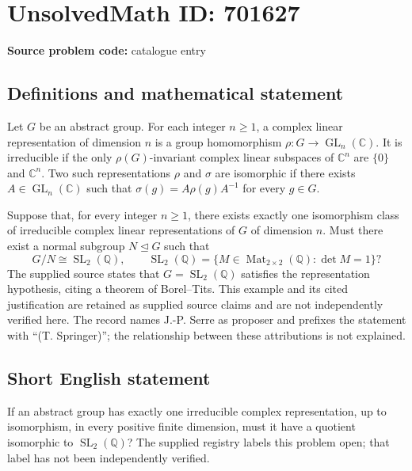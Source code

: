 \documentclass[11pt]{article}
\newcommand{\Q}{\mathbb{Q}}
\newcommand{\C}{\mathbb{C}}
\begin{document}
\section*{UnsolvedMath ID: 701627}
\textbf{Source problem code:} catalogue entry
\subsection{Definitions and mathematical statement}
Let \(G\) be an abstract group. For each integer \(n\geq 1\), a complex linear representation of dimension \(n\) is a group homomorphism \(\rho\colon G\to\operatorname{GL}_n(\C)\). It is irreducible if the only \(\rho(G)\)-invariant complex linear subspaces of \(\C^n\) are \(\{0\}\) and \(\C^n\). Two such representations \(\rho\) and \(\sigma\) are isomorphic if there exists \(A\in\operatorname{GL}_n(\C)\) such that \(\sigma(g)=A\rho(g)A^{-1}\) for every \(g\in G\).

Suppose that, for every integer \(n\geq 1\), there exists exactly one isomorphism class of irreducible complex linear representations of \(G\) of dimension \(n\). Must there exist a normal subgroup \(N\trianglelefteq G\) such that
\[
G/N\cong\operatorname{SL}_2(\Q),
\qquad
\operatorname{SL}_2(\Q)=\{M\in\operatorname{Mat}_{2\times2}(\Q):\det M=1\}?
\]
The supplied source states that \(G=\operatorname{SL}_2(\Q)\) satisfies the representation hypothesis, citing a theorem of Borel--Tits. This example and its cited justification are retained as supplied source claims and are not independently verified here. The record names J.-P. Serre as proposer and prefixes the statement with ``(T. Springer)''; the relationship between these attributions is not explained.
\subsection{Short English statement}
If an abstract group has exactly one irreducible complex representation, up to isomorphism, in every positive finite dimension, must it have a quotient isomorphic to \(\operatorname{SL}_2(\Q)\)? The supplied registry labels this problem open; that label has not been independently verified.
\end{document}
